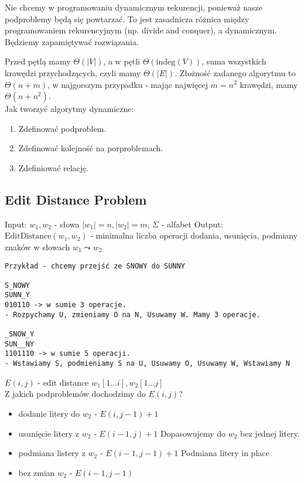 \documentclass{article}
\numberwithin{equation}{subsection}
\begin{document}
Nie chcemy w programowaniu dynamicznym rekurencji, ponieważ nasze podproblemy będą się powtarzać.
To jest zasadnicza różnica między programowaniem rekurencyjnym (np. divide and conquer), a dynamicznym.
Będziemy zapamiętywać rozwiązania.

Przed pętlą mamy $\Theta(|V|)$, a w pętli $\Theta(\text{indeg}(V))$, suma wszystkich krawędzi przychodzących, czyli mamy $\Theta(|E|)$.
Złożność zadanego algorytmu to $\Theta(n+m)$, w najgorszym przypadku - mając najwięcej $m=n^2$ krawędzi, mamy $\Theta(n+n^2)$.\\

\noindent
Jak tworzyć algorytmy dynamiczne:
\begin{enumerate}
    \item Zdefinować podproblem.
    \item Zdefinować kolejność na porproblemach.
    \item Zdefiniować relację.
\end{enumerate}

\subsection{Edit Distance Problem}

Input: $w_1, w_2$ - słowa $|w_1|=n, |w_2|=m$, $\Sigma$ - alfabet
Output: $\text{EditDistance}(w_1,w_2)$ - minimalna liczba operacji dodania, usunięcia, podmiany znaków w słowach $w_1 \leadsto w_2$

\begin{verbatim}
Przykład - chcemy przejść ze SNOWY do SUNNY

S_NOWY
SUNN_Y 
010110 -> w sumie 3 operacje.
- Rozpychamy U, zmieniamy O na N, Usuwamy W. Mamy 3 operacje.

_SNOW_Y
SUN__NY
1101110 -> w sumie 5 operacji.
- Wstawiamy S, podmieniamy S na U, Usuwamy O, Usuwamy W, Wstawiamy N
\end{verbatim}

$E(i,j)$ - edit distance $w_1[1\dots i], w_2[1\dots j]$\\

Z jakich podproblemów dochodzimy do $E(i,j)$?
\begin{itemize}
    \item dodanie litery do $w_2$ - $E(i, j-1) + 1$
    \item usunięcie litery z $w_2$ - $E(i-1, j) + 1$ Dopasowujemy do $w_2$ bez jednej litery.
    \item podmiana listery z $w_2$ - $E(i-1, j-1) + 1$ Podmiana litery in place
    \item bez zmian $w_2$ - $E(i-1, j-1)$
\end{itemize}
\end{document}
